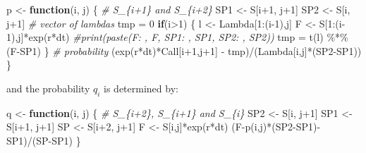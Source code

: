 \documentclass[]{tufte-book}
\newenvironment{Shaded}{}{}
\newcommand{\CommentTok}[1]{\textcolor[rgb]{0.38,0.63,0.69}{\textit{#1}}}
\newcommand{\ControlFlowTok}[1]{\textcolor[rgb]{0.00,0.44,0.13}{\textbf{#1}}}
\newcommand{\DecValTok}[1]{\textcolor[rgb]{0.25,0.63,0.44}{#1}}
\newcommand{\FunctionTok}[1]{\textcolor[rgb]{0.02,0.16,0.49}{#1}}
\newcommand{\NormalTok}[1]{#1}
\newcommand{\OtherTok}[1]{\textcolor[rgb]{0.00,0.44,0.13}{#1}}
\newcommand{\SpecialCharTok}[1]{\textcolor[rgb]{0.25,0.44,0.63}{#1}}
\begin{document}
\begin{Shaded}
\begin{Highlighting}[]
\NormalTok{  p }\OtherTok{\textless{}{-}} \ControlFlowTok{function}\NormalTok{(i, j) \{}
    \CommentTok{\# S\textquotesingle{}\_\{i+1\} and S\textquotesingle{}\_\{i+2\}}
\NormalTok{    SP1 }\OtherTok{\textless{}{-}}\NormalTok{ S[i}\SpecialCharTok{+}\DecValTok{1}\NormalTok{, j}\SpecialCharTok{+}\DecValTok{1}\NormalTok{]}
\NormalTok{    SP2 }\OtherTok{\textless{}{-}}\NormalTok{ S[i, j}\SpecialCharTok{+}\DecValTok{1}\NormalTok{]}
    \CommentTok{\# vector of lambdas}
\NormalTok{    tmp }\OtherTok{=} \DecValTok{0}
    \ControlFlowTok{if}\NormalTok{(i}\SpecialCharTok{\textgreater{}}\DecValTok{1}\NormalTok{) \{}
\NormalTok{      l }\OtherTok{\textless{}{-}}\NormalTok{ Lambda[}\DecValTok{1}\SpecialCharTok{:}\NormalTok{(i}\DecValTok{{-}1}\NormalTok{),j]}
\NormalTok{      F }\OtherTok{\textless{}{-}}\NormalTok{ S[}\DecValTok{1}\SpecialCharTok{:}\NormalTok{(i}\DecValTok{{-}1}\NormalTok{),j]}\SpecialCharTok{*}\FunctionTok{exp}\NormalTok{(r}\SpecialCharTok{*}\NormalTok{dt)}
      \CommentTok{\#print(paste(\textquotesingle{}F: \textquotesingle{}, F, \textquotesingle{} SP1: \textquotesingle{}, SP1, \textquotesingle{} SP2: \textquotesingle{}, SP2))}
\NormalTok{      tmp }\OtherTok{=} \FunctionTok{t}\NormalTok{(l) }\SpecialCharTok{\%*\%}\NormalTok{ (F}\SpecialCharTok{{-}}\NormalTok{SP1)}
\NormalTok{    \}}
    \CommentTok{\# probability}
\NormalTok{    (}\FunctionTok{exp}\NormalTok{(r}\SpecialCharTok{*}\NormalTok{dt)}\SpecialCharTok{*}\NormalTok{Call[i}\SpecialCharTok{+}\DecValTok{1}\NormalTok{,j}\SpecialCharTok{+}\DecValTok{1}\NormalTok{] }\SpecialCharTok{{-}}\NormalTok{ tmp)}\SpecialCharTok{/}\NormalTok{(Lambda[i,j]}\SpecialCharTok{*}\NormalTok{(SP2}\SpecialCharTok{{-}}\NormalTok{SP1))}
\NormalTok{  \}}
\end{Highlighting}
\end{Shaded}

and the probability \(q_i\) is determined by:

\begin{Shaded}
\begin{Highlighting}[]
\NormalTok{  q }\OtherTok{\textless{}{-}} \ControlFlowTok{function}\NormalTok{(i, j) \{}
    \CommentTok{\# S\textquotesingle{}\_\{i+2\}, S\textquotesingle{}\_\{i+1\} and S\textquotesingle{}\_\{i\}}
\NormalTok{    SP2 }\OtherTok{\textless{}{-}}\NormalTok{ S[i, j}\SpecialCharTok{+}\DecValTok{1}\NormalTok{]}
\NormalTok{    SP1 }\OtherTok{\textless{}{-}}\NormalTok{ S[i}\SpecialCharTok{+}\DecValTok{1}\NormalTok{, j}\SpecialCharTok{+}\DecValTok{1}\NormalTok{]}
\NormalTok{    SP }\OtherTok{\textless{}{-}}\NormalTok{ S[i}\SpecialCharTok{+}\DecValTok{2}\NormalTok{, j}\SpecialCharTok{+}\DecValTok{1}\NormalTok{]}
\NormalTok{    F }\OtherTok{\textless{}{-}}\NormalTok{ S[i,j]}\SpecialCharTok{*}\FunctionTok{exp}\NormalTok{(r}\SpecialCharTok{*}\NormalTok{dt)}
\NormalTok{    (F}\SpecialCharTok{{-}}\FunctionTok{p}\NormalTok{(i,j)}\SpecialCharTok{*}\NormalTok{(SP2}\SpecialCharTok{{-}}\NormalTok{SP1)}\SpecialCharTok{{-}}\NormalTok{SP1)}\SpecialCharTok{/}\NormalTok{(SP}\SpecialCharTok{{-}}\NormalTok{SP1)}
\NormalTok{  \}}
\end{Highlighting}
\end{Shaded}
\end{document}
